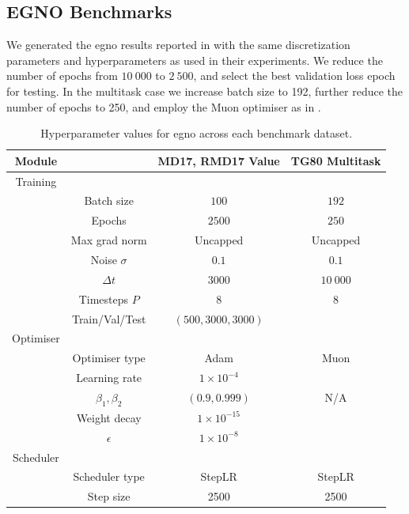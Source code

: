 \newpage
\subsection{EGNO Benchmarks}
\label{sec:egno_hyperparams}
We generated the \gls{egno} results reported in  with the same discretization parameters and hyperparameters as used in their experiments. We reduce the number of epochs from \(10\ 000\) to \(2\ 500\), and select the best validation loss epoch for testing. In the multitask case we increase batch size to 192, further reduce the number of epochs to 250, and employ the Muon optimiser as in .

\begin{table}[H]
    \centering
    \caption{Hyperparameter values for \gls{egno} across each benchmark dataset.}
    \label{tab:egno_hparams}
    \begin{tabular}{cccc}
        Module & & MD17, RMD17 Value & TG80 Multitask \\
        \midrule
        Training & & \\
        & Batch size & \( 100 \) & \( 192 \) \\
        & Epochs & \( 2500 \) & \( 250 \) \\
        & Max grad norm & Uncapped & Uncapped  \\
        & Noise \(\sigma\) & \( 0.1 \) & \(0.1\) \\
        & \(\Delta t\) & \( 3000 \) & \(10\ 000\) \\
        & Timesteps \(P\) & \( 8 \) & \(8\) \\
        & Train/Val/Test & \( (500,3000,3000) \) \\
        \midrule
        Optimiser & & \\
        & Optimiser type & Adam \cite{kingma_adam_2014} & Muon \cite{jordan_muon_2024, kim_pytorch_optimizer_2021}  \\
        & Learning rate & \( 1\times10^{-4} \) \\
        & \(\beta_1, \beta_2\) & \( (0.9, 0.999) \) & N/A \\
        & Weight decay & \( 1\times10^{-15} \) \\
        & \(\epsilon\) & \( 1\times10^{-8} \) \\
        \midrule
        Scheduler & & \\
        & Scheduler type & StepLR & StepLR \\
        & Step size & 2500 & 2500 \\

\end{tabular}
\end{table}
